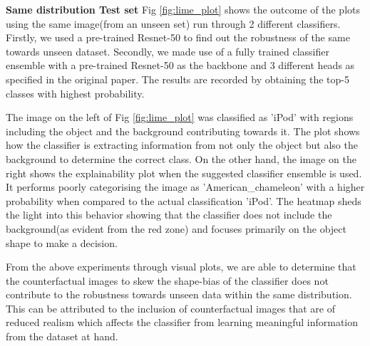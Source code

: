 \textbf{Same distribution Test set}
Fig \ref{fig:lime_plot} shows the outcome of the plots using the same image(from an unseen set) run through 2 different classifiers. Firstly, we used a pre-trained Resnet-50 to find out the robustness of the same towards unseen dataset. Secondly, we made use of a fully trained classifier ensemble with a pre-trained Resnet-50 as the backbone and 3 different heads as specified in the original paper\cite{sauer2021counterfactual}. The results are recorded by obtaining the top-5 classes with highest probability. 

The image on the left of Fig \ref{fig:lime_plot} was classified as 'iPod' with regions including the object and the background contributing towards it. The plot shows how the classifier is extracting information from not only the object but also the background to determine the correct class. On the other hand, the image on the right shows the explainability plot when the suggested classifier ensemble is used. It performs poorly categorising the image as 'American\_chameleon' with a higher probability when compared to the actual classification 'iPod'. The heatmap sheds the light into this behavior showing that the classifier does not include the background(as evident from the red zone) and focuses primarily on the object shape to make a decision.

From the above experiments through visual plots, we are able to determine that the counterfactual images to skew the shape-bias of the classifier does not contribute to the robustness towards unseen data within the same distribution. This can be attributed to the inclusion of counterfactual images that are of reduced realism which affects the classifier from learning meaningful information from the dataset at hand.


